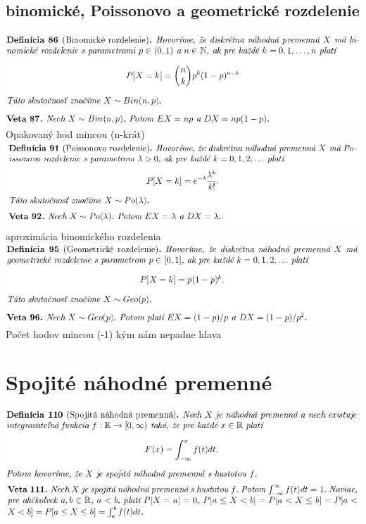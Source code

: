 \subsection {binomické, Poissonovo a geometrické rozdelenie}
\includegraphics[width=1\textwidth]{images/binom_rozd}\\
Opakovaný hod mincou (n-krát)\\
\includegraphics[width=1\textwidth]{images/poiss_rozd}\\
aproximácia binomického rozdelenia\\
\includegraphics[width=1\textwidth]{images/geom_rozd}\\
Počet hodov mincou (-1) kým nám nepadne hlava\\

\section{Spojité náhodné premenné}
\includegraphics[width=1\textwidth]{images/spoj_nah_prem}\\
\includegraphics[width=1\textwidth]{images/spoj_nah_prem_II}\\

